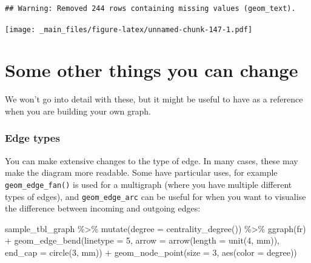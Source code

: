 \documentclass[
]{book}
\newenvironment{Shaded}{\begin{snugshade}}{\end{snugshade}}
\newcommand{\AttributeTok}[1]{\textcolor[rgb]{0.77,0.63,0.00}{#1}}
\newcommand{\DecValTok}[1]{\textcolor[rgb]{0.00,0.00,0.81}{#1}}
\newcommand{\FunctionTok}[1]{\textcolor[rgb]{0.00,0.00,0.00}{#1}}
\newcommand{\NormalTok}[1]{#1}
\newcommand{\SpecialCharTok}[1]{\textcolor[rgb]{0.00,0.00,0.00}{#1}}
\newcommand{\StringTok}[1]{\textcolor[rgb]{0.31,0.60,0.02}{#1}}
\begin{document}
\begin{verbatim}
## Warning: Removed 244 rows containing missing values (geom_text).
\end{verbatim}

\texttt{[image: \_main\_files/figure-latex/unnamed-chunk-147-1.pdf]}

\hypertarget{some-other-things-you-can-change}{%
\section{Some other things you can change}\label{some-other-things-you-can-change}}

We won't go into detail with these, but it might be useful to have as a reference when you are building your own graph.

\hypertarget{edge-types}{%
\subsubsection{Edge types}\label{edge-types}}

You can make extensive changes to the type of edge. In many cases, these may make the diagram more readable. Some have particular uses, for example \texttt{geom\_edge\_fan()} is used for a multigraph (where you have multiple different types of edges), and \texttt{geom\_edge\_arc} can be useful for when you want to visualise the difference between incoming and outgoing edges:

\begin{Shaded}
\begin{Highlighting}[]
\NormalTok{sample\_tbl\_graph }\SpecialCharTok{\%\textgreater{}\%} 
  \FunctionTok{mutate}\NormalTok{(}\AttributeTok{degree =} \FunctionTok{centrality\_degree}\NormalTok{()) }\SpecialCharTok{\%\textgreater{}\%} 
  \FunctionTok{ggraph}\NormalTok{(}\StringTok{\textquotesingle{}fr\textquotesingle{}}\NormalTok{) }\SpecialCharTok{+} 
  \FunctionTok{geom\_edge\_bend}\NormalTok{(}\AttributeTok{linetype =} \DecValTok{5}\NormalTok{,}
                 \AttributeTok{arrow =} \FunctionTok{arrow}\NormalTok{(}\AttributeTok{length =} \FunctionTok{unit}\NormalTok{(}\DecValTok{4}\NormalTok{, }\StringTok{\textquotesingle{}mm\textquotesingle{}}\NormalTok{)), }
                   \AttributeTok{end\_cap =} \FunctionTok{circle}\NormalTok{(}\DecValTok{3}\NormalTok{, }\StringTok{\textquotesingle{}mm\textquotesingle{}}\NormalTok{)) }\SpecialCharTok{+} 
  \FunctionTok{geom\_node\_point}\NormalTok{(}\AttributeTok{size =} \DecValTok{3}\NormalTok{, }\FunctionTok{aes}\NormalTok{(}\AttributeTok{color =}\NormalTok{ degree))}
\end{Highlighting}
\end{Shaded}
\end{document}
